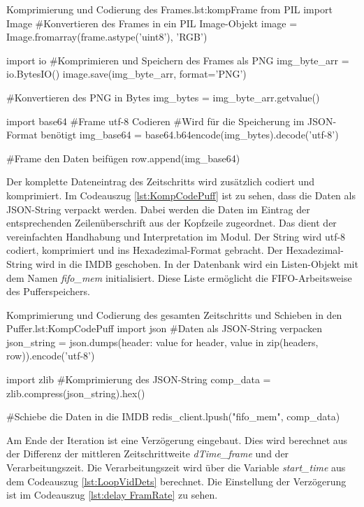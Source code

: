 \begin{pythoncode}{Komprimierung und Codierung des Frames.}{lst:kompFrame}
from PIL import Image
#Konvertieren des Frames in ein PIL Image-Objekt
image = Image.fromarray(frame.astype('uint8'), 'RGB')

import io
#Komprimieren und Speichern des Frames als PNG
img_byte_arr = io.BytesIO()
image.save(img_byte_arr, format='PNG')

#Konvertieren des PNG in Bytes
img_bytes = img_byte_arr.getvalue()

import base64
#Frame utf-8 Codieren
#Wird für die Speicherung im JSON-Format benötigt
img_base64 = base64.b64encode(img_bytes).decode('utf-8')

#Frame den Daten beifügen
row.append(img_base64)
\end{pythoncode}

Der komplette Dateneintrag des Zeitschritts wird zusätzlich codiert und komprimiert. Im Codeauszug \ref{lst:KompCodePuff} ist zu sehen, dass die Daten als JSON-String verpackt werden. Dabei werden die Daten im Eintrag der entsprechenden Zeilenüberschrift aus der Kopfzeile zugeordnet. Das dient der vereinfachten Handhabung und Interpretation im Modul. Der String wird utf-8 codiert, komprimiert und ins Hexadezimal-Format gebracht. Der Hexadezimal-String wird in die IMDB geschoben. In der Datenbank wird ein Listen-Objekt mit dem Namen \textit{fifo\_mem} initialisiert. Diese Liste ermöglicht die FIFO-Arbeitsweise des Pufferspeichers.

\begin{pythoncode}{Komprimierung und Codierung des gesamten Zeitschritts und Schieben in den Puffer.}{lst:KompCodePuff}
import json
#Daten als JSON-String verpacken
json_string = json.dumps({header: value for header, value in zip(headers, row)}).encode('utf-8')

import zlib
#Komprimierung des JSON-String 
comp_data = zlib.compress(json_string).hex()

#Schiebe die Daten in die IMDB
redis_client.lpush("fifo_mem", comp_data)
\end{pythoncode}

Am Ende der Iteration ist eine Verzögerung eingebaut. Dies wird berechnet aus der Differenz der mittleren Zeitschrittweite \textit{dTime\_frame} und der Verarbeitungszeit. Die Verarbeitungszeit wird über die Variable \textit{start\_time} aus dem Codeauszug \ref{lst:LoopVidDets} berechnet. Die Einstellung der Verzögerung ist im Codeauszug \ref{lst:delay FramRate} zu sehen.

